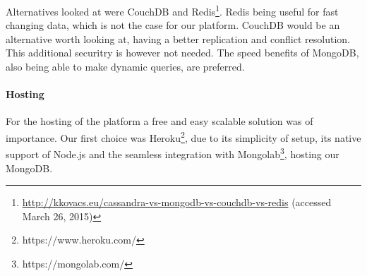 



		Alternatives looked at were CouchDB and Redis\footnote{\url{http://kkovacs.eu/cassandra-vs-mongodb-vs-couchdb-vs-redis} (accessed March 26, 2015)}. Redis being useful for fast changing data, which is not the case for our platform. CouchDB would be an alternative worth looking at, having a better replication and conflict resolution. This additional securitry is however not needed. The speed benefits of MongoDB, also being able to make dynamic queries, are preferred.



	\paragraph{Hosting}

		For the hosting of the platform a free and easy scalable solution was of importance. Our first choice was Heroku\footnote{https://www.heroku.com/}, due to its simplicity of setup, its native support of Node.js and the seamless integration with Mongolab\footnote{https://mongolab.com/}, hosting our MongoDB.


